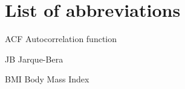 \section*{List of abbreviations}

\begin{abbrv}
\item[ACF]                   Autocorrelation function
\item[JB]                    Jarque-Bera
\item[BMI]                   Body Mass Index
\
\end{abbrv}
